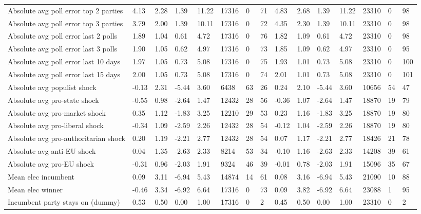 \begin{longtable}{lllllllllllllll}
Absolute avg poll error top 2 parties & 4.13 & 2.28 & 1.39 & 11.22 & 17316 & 0 & 71 & 4.83 & 2.68 & 1.39 & 11.22 & 23310 & 0 & 98\\
Absolute avg poll error top 3 parties & 3.79 & 2.00 & 1.39 & 10.11 & 17316 & 0 & 72 & 4.35 & 2.30 & 1.39 & 10.11 & 23310 & 0 & 98\\
Absolute avg poll error last 2 polls & 1.89 & 1.04 & 0.61 & 4.72 & 17316 & 0 & 76 & 1.82 & 1.09 & 0.61 & 4.72 & 23310 & 0 & 98\\
\addlinespace
Absolute avg poll error last 3 polls & 1.90 & 1.05 & 0.62 & 4.97 & 17316 & 0 & 73 & 1.85 & 1.09 & 0.62 & 4.97 & 23310 & 0 & 95\\
Absolute avg poll error last 10 days & 1.97 & 1.05 & 0.73 & 5.08 & 17316 & 0 & 75 & 1.93 & 1.01 & 0.73 & 5.08 & 23310 & 0 & 100\\
Absolute avg poll error last 15 days & 2.00 & 1.05 & 0.73 & 5.08 & 17316 & 0 & 74 & 2.01 & 1.01 & 0.73 & 5.08 & 23310 & 0 & 101\\
Absolute avg populist shock & -0.13 & 2.31 & -5.44 & 3.60 & 6438 & 63 & 26 & 0.24 & 2.10 & -5.44 & 3.60 & 10656 & 54 & 47\\
Absolute avg pro-state shock & -0.55 & 0.98 & -2.64 & 1.47 & 12432 & 28 & 56 & -0.36 & 1.07 & -2.64 & 1.47 & 18870 & 19 & 79\\
\addlinespace
Absolute avg pro-market shock & 0.35 & 1.12 & -1.83 & 3.25 & 12210 & 29 & 53 & 0.23 & 1.16 & -1.83 & 3.25 & 18870 & 19 & 80\\
Absolute avg pro-liberal shock & -0.34 & 1.09 & -2.59 & 2.26 & 12432 & 28 & 54 & -0.12 & 1.04 & -2.59 & 2.26 & 18870 & 19 & 80\\
Absolute avg pro-authoritarian shock & 0.20 & 1.19 & -2.21 & 2.77 & 12432 & 28 & 54 & 0.07 & 1.17 & -2.21 & 2.77 & 18426 & 21 & 78\\
Absolute avg anti-EU shock & 0.04 & 1.35 & -2.63 & 2.33 & 8214 & 53 & 34 & -0.10 & 1.16 & -2.63 & 2.33 & 14208 & 39 & 61\\
Absolute avg pro-EU shock & -0.31 & 0.96 & -2.03 & 1.91 & 9324 & 46 & 39 & -0.01 & 0.78 & -2.03 & 1.91 & 15096 & 35 & 67\\
\addlinespace
Mean elec incumbent & 0.09 & 3.11 & -6.94 & 5.43 & 14874 & 14 & 61 & 0.08 & 3.16 & -6.94 & 5.43 & 21090 & 10 & 88\\
Mean elec winner & -0.46 & 3.34 & -6.92 & 6.64 & 17316 & 0 & 73 & 0.09 & 3.82 & -6.92 & 6.64 & 23088 & 1 & 95\\
Incumbent party stays on (dummy) & 0.53 & 0.50 & 0.00 & 1.00 & 17316 & 0 & 2 & 0.45 & 0.50 & 0.00 & 1.00 & 23310 & 0 & 2\\

\end{longtable}

